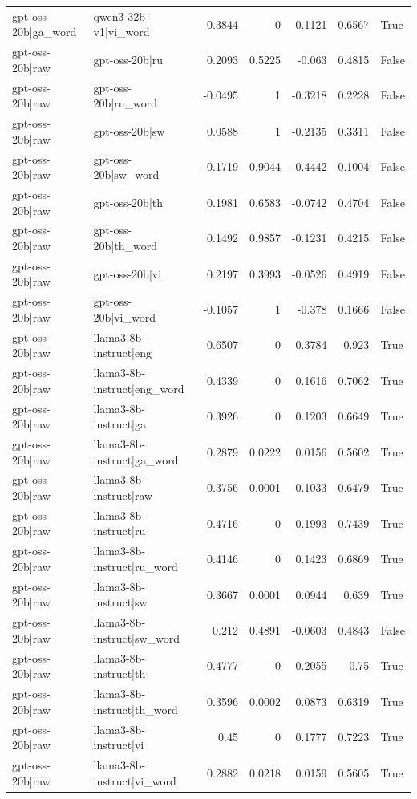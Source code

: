 \begin{table}
\begin{tabular}{l l r r r r l}
gpt-oss-20b|ga_word & qwen3-32b-v1|vi_word & 0.3844 & 0 & 0.1121 & 0.6567 & True \\
gpt-oss-20b|raw & gpt-oss-20b|ru & 0.2093 & 0.5225 & -0.063 & 0.4815 & False \\
gpt-oss-20b|raw & gpt-oss-20b|ru_word & -0.0495 & 1 & -0.3218 & 0.2228 & False \\
gpt-oss-20b|raw & gpt-oss-20b|sw & 0.0588 & 1 & -0.2135 & 0.3311 & False \\
gpt-oss-20b|raw & gpt-oss-20b|sw_word & -0.1719 & 0.9044 & -0.4442 & 0.1004 & False \\
gpt-oss-20b|raw & gpt-oss-20b|th & 0.1981 & 0.6583 & -0.0742 & 0.4704 & False \\
gpt-oss-20b|raw & gpt-oss-20b|th_word & 0.1492 & 0.9857 & -0.1231 & 0.4215 & False \\
gpt-oss-20b|raw & gpt-oss-20b|vi & 0.2197 & 0.3993 & -0.0526 & 0.4919 & False \\
gpt-oss-20b|raw & gpt-oss-20b|vi_word & -0.1057 & 1 & -0.378 & 0.1666 & False \\
gpt-oss-20b|raw & llama3-8b-instruct|eng & 0.6507 & 0 & 0.3784 & 0.923 & True \\
gpt-oss-20b|raw & llama3-8b-instruct|eng_word & 0.4339 & 0 & 0.1616 & 0.7062 & True \\
gpt-oss-20b|raw & llama3-8b-instruct|ga & 0.3926 & 0 & 0.1203 & 0.6649 & True \\
gpt-oss-20b|raw & llama3-8b-instruct|ga_word & 0.2879 & 0.0222 & 0.0156 & 0.5602 & True \\
gpt-oss-20b|raw & llama3-8b-instruct|raw & 0.3756 & 0.0001 & 0.1033 & 0.6479 & True \\
gpt-oss-20b|raw & llama3-8b-instruct|ru & 0.4716 & 0 & 0.1993 & 0.7439 & True \\
gpt-oss-20b|raw & llama3-8b-instruct|ru_word & 0.4146 & 0 & 0.1423 & 0.6869 & True \\
gpt-oss-20b|raw & llama3-8b-instruct|sw & 0.3667 & 0.0001 & 0.0944 & 0.639 & True \\
gpt-oss-20b|raw & llama3-8b-instruct|sw_word & 0.212 & 0.4891 & -0.0603 & 0.4843 & False \\
gpt-oss-20b|raw & llama3-8b-instruct|th & 0.4777 & 0 & 0.2055 & 0.75 & True \\
gpt-oss-20b|raw & llama3-8b-instruct|th_word & 0.3596 & 0.0002 & 0.0873 & 0.6319 & True \\
gpt-oss-20b|raw & llama3-8b-instruct|vi & 0.45 & 0 & 0.1777 & 0.7223 & True \\
gpt-oss-20b|raw & llama3-8b-instruct|vi_word & 0.2882 & 0.0218 & 0.0159 & 0.5605 & True \\

\end{tabular}
\end{table}
